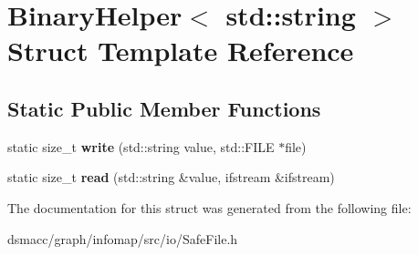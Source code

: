 \hypertarget{structBinaryHelper_3_01std_1_1string_01_4}{}\section{Binary\+Helper$<$ std\+:\+:string $>$ Struct Template Reference}
\label{structBinaryHelper_3_01std_1_1string_01_4}
\subsection*{Static Public Member Functions}
\begin{DoxyCompactItemize}
\item 
\mbox{\label{structBinaryHelper_3_01std_1_1string_01_4_a7017a991135c6dac8046f43ae5ac6d42}} 
static size\+\_\+t {\bfseries write} (std\+::string value, std\+::\+F\+I\+LE $\ast$file)
\item 
\mbox{\label{structBinaryHelper_3_01std_1_1string_01_4_abd6dc869542c9403a98b55bf41cd1919}} 
static size\+\_\+t {\bfseries read} (std\+::string \&value, ifstream \&ifstream)
\end{DoxyCompactItemize}


The documentation for this struct was generated from the following file\+:\begin{DoxyCompactItemize}
\item 
dsmacc/graph/infomap/src/io/Safe\+File.\+h\end{DoxyCompactItemize}
